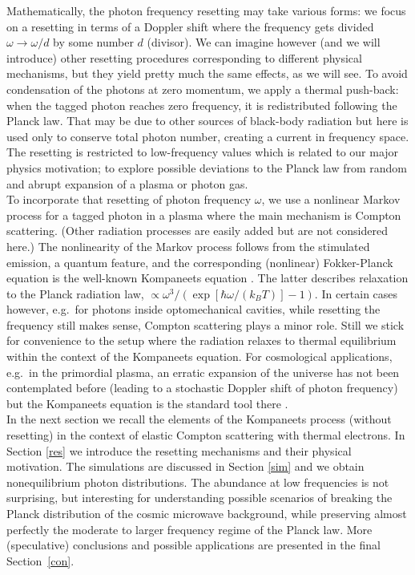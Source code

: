 \documentclass[a4paper,12pt,reqno,superscriptaddress,nofootinbib]{revtex4}
\theoremstyle{plain}
\theoremstyle{definition}
\theoremstyle{remark}
\newcommand{\0}{^{(0)}}
\newcommand{\1}{^{(1)}}
\newcommand{\2}{^{(2)}}
\begin{document}
Mathematically, the photon frequency resetting may take various forms: we focus on a resetting in terms of a Doppler shift where the frequency gets divided $\omega \rightarrow \omega/d$ by some number $d$ (divisor).  We can imagine however (and we will introduce) other resetting procedures corresponding to different physical mechanisms, but they yield pretty much the same effects, as we will see.  To avoid condensation of the photons at zero momentum, we apply a thermal push-back: when the tagged photon reaches zero frequency, it is redistributed following the Planck law. That may be due to other sources of black-body radiation but here is used only to conserve total photon number, creating a current in frequency space.  The  resetting is restricted to low-frequency values which is related to our major physics motivation; to explore possible deviations to the Planck law from random and abrupt expansion of a plasma or photon gas.   \\
To incorporate that resetting of photon frequency  $\omega$, we use a nonlinear Markov process for a tagged photon in a plasma where the main mechanism is Compton scattering. (Other radiation processes are easily added but are not considered here.)  The nonlinearity of the Markov process follows from the stimulated emission, a quantum feature, and the corresponding (nonlinear) Fokker-Planck equation is the well-known Kompaneets equation \cite{kompa}.  The latter describes relaxation to the Planck radiation law, $\propto \omega^3 / (\exp[\hbar\omega/(k_BT)]-1)$.    In certain cases however, e.g.\ for photons inside optomechanical cavities, while resetting  the frequency still makes sense, Compton scattering plays a minor role.  Still we stick for convenience to the setup where the radiation relaxes to thermal equilibrium within the context of the Kompaneets equation. For cosmological applications, e.g.\ in the primordial plasma, an erratic expansion of the universe has not been contemplated before (leading to a stochastic Doppler shift of photon frequency) but the Kompaneets equation is the standard tool there \cite{peebles}.\\


In the next section we recall the elements of the Kompaneets process (without resetting) in the context of elastic Compton scattering with thermal electrons. In Section \ref{res} we introduce the resetting mechanisms and their physical motivation.  The simulations are discussed in Section \ref{sim} and we obtain nonequilibrium photon distributions.  The abundance at low frequencies is not surprising, but interesting for understanding possible scenarios of breaking the Planck distribution of the cosmic microwave background, while preserving almost perfectly the moderate to larger frequency regime of the Planck law.  More (speculative) conclusions and possible applications are presented in the final Section~\ref{con}. 
\end{document}
